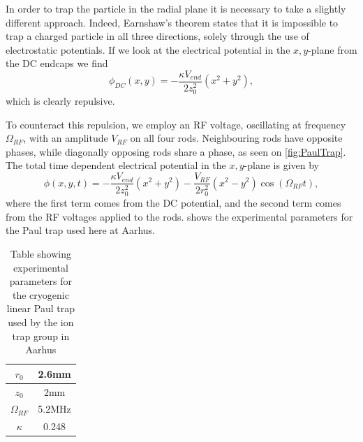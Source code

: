 In order to trap the particle in the radial plane it is necessary to take a slightly different approach. Indeed, Earnshaw's theorem \cite{EarnshawOnTN} states
that it is impossible to trap a charged particle in all three directions, solely through the use of electrostatic potentials. If we look at the electrical potential in the $x,y$-plane from the DC endcaps we find
\begin{equation}
    \phi_{DC}(x,y) = -\frac{\kappa V_{end}}{2z_0^2}(x^2+y^2),
\end{equation}
which is clearly repulsive.

To counteract this repulsion, we employ an RF voltage, oscillating at frequency $\Omega_{RF}$, with an amplitude $V_{RF}$ on all four rods. Neighbouring rods have opposite phases, while diagonally opposing rods share a phase, as seen on \cref{fig:PaulTrap}.
The total time dependent electrical potential in the $x,y$-plane is given by \cite{Fisher_2017}
\begin{equation}
    \phi(x,y,t) = -\frac{\kappa V_{end}}{2z_0^2}(x^2+y^2)-\frac{V_{RF}}{2r_0^2}(x^2-y^2)\cos{(\Omega_{RF}t)},
\end{equation}
where the first term comes from the DC potential, and the second term comes from the RF voltages applied to the rods.  shows the experimental parameters for the Paul trap used here at Aarhus.

\begin{table}[h]
    \centering
    \begin{tabular}{|c|c|}
    \hline
    $r_0$         & 2.6mm  \\ \hline
    $z_0$         & 2mm    \\ \hline
    $\Omega_{RF}$ & 5.2MHz \\ \hline
    $\kappa$      & 0.248  \\ \hline
    \end{tabular}
    \caption{Table showing experimental parameters for the cryogenic linear Paul trap used by the ion trap group in Aarhus}
    \label{tab:params}
    \end{table}

